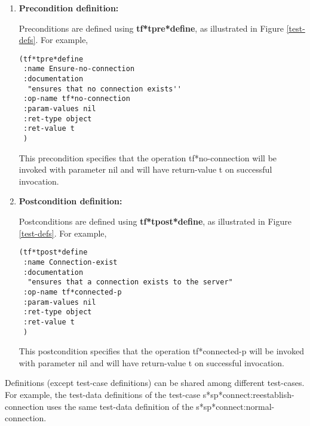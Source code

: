 \begin {enumerate}
\small\begin{verbatim}
(tf*tdata*define
 :name Valid-machine-name1
 :documentation 
  ``a valid machine name \"zero.ics.hawaii.edu\"''
 :values ("zero.ics.hawaii.edu")
 )

(tf*tdata*define
 :name Valid-machine-name2
 :documentation 
  ``a valid machine name \"zero.ics\"''
 :values ("zero.ics")
 )
\end{verbatim}\normalsize

These definitions specify that the test-case s*sp*connect:normal-connection
will invoke s*sp*connect with the parameter value either
``zero.ics.hawaii.edu''or ``zero.ics''.

\item {\bf Precondition definition:}

Preconditions are defined using {\bf tf*tpre*define}, as illustrated
in Figure \ref{test-defs}.  For example,

\small\begin{verbatim}
(tf*tpre*define
 :name Ensure-no-connection
 :documentation 
  "ensures that no connection exists''
 :op-name tf*no-connection
 :param-values nil
 :ret-type object
 :ret-value t
 )
\end{verbatim}\normalsize

This precondition specifies that the operation tf*no-connection will
be invoked with parameter nil and will have return-value t on successful
invocation.

\item {\bf Postcondition definition:}

Postconditions are defined using {\bf tf*tpost*define}, as illustrated
in Figure \ref{test-defs}.  For example,

\small\begin{verbatim}
(tf*tpost*define
 :name Connection-exist
 :documentation 
  "ensures that a connection exists to the server"
 :op-name tf*connected-p
 :param-values nil
 :ret-type object
 :ret-value t
 )
\end{verbatim}\normalsize

This postcondition specifies that the operation tf*connected-p
will be invoked with parameter nil and will have return-value t on
successful invocation.

\end {enumerate}

Definitions (except test-case definitions) can be shared among different
test-cases.
For example, the test-data definitions of the
test-case s*sp*connect:reestablish-connection uses
the same test-data definition of the s*sp*connect:normal-connection.  

